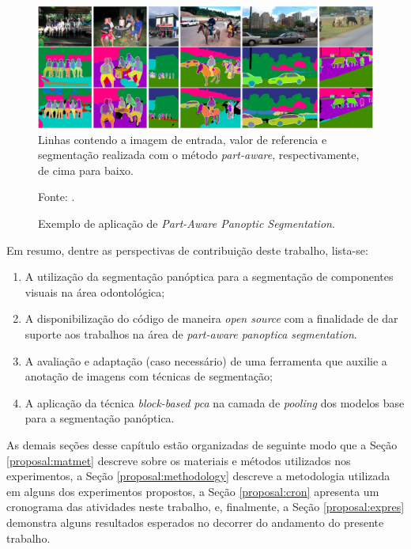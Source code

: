 \begin{figure}[H]
    \centering
    \caption{Exemplo de aplicação de \textit{Part-Aware Panoptic Segmentation}.}
    \includegraphics[width=1\linewidth]{recursos/imagens/proposal/part-aware-example.png}
    \label{proposal:proposal:fig:3}
    {\tiny Linhas contendo a imagem de entrada, valor de referencia e segmentação realizada com o método \textit{part-aware}, respectivamente, de cima para baixo.}

    \vspace*{1 cm}
    Fonte: \cite{DeGeus2021}.
\end{figure}

Em resumo, dentre as perspectivas de contribuição deste trabalho, lista-se:

\begin{enumerate}[I]
  \item A utilização da segmentação panóptica para a segmentação de componentes visuais na área odontológica;
  \item A disponibilização do código de maneira \textit{open source} com a finalidade de dar suporte aos trabalhos na área de \textit{part-aware panoptica segmentation}.
  \item A avaliação e adaptação (caso necessário) de uma ferramenta que auxilie a anotação de imagens com técnicas de segmentação;
  \item A aplicação da técnica \textit{block-based pca} na camada de \textit{pooling} dos modelos base para a segmentação panóptica.
\end{enumerate}

As demais seções desse capítulo estão organizadas de seguinte modo que a Seção \ref{proposal:matmet} descreve sobre os materiais e métodos utilizados nos experimentos, a Seção \ref{proposal:methodology} descreve a metodologia utilizada em alguns dos experimentos propostos, a Seção \ref{proposal:cron} apresenta um cronograma das atividades neste trabalho, e, finalmente, a Seção \ref{proposal:expres} demonstra alguns resultados esperados no decorrer do andamento do presente trabalho.


